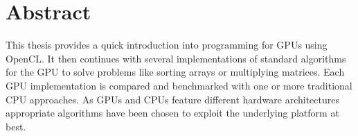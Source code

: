 \section*{Abstract}

This thesis provides a quick introduction into programming for GPUs using OpenCL. It then continues with several implementations of standard algorithms for the GPU to solve problems like sorting arrays or multiplying matrices. Each GPU implementation is compared and benchmarked with one or more traditional CPU approaches. As GPUs and CPUs feature different hardware architectures appropriate algorithms have been chosen to exploit the underlying platform at best.